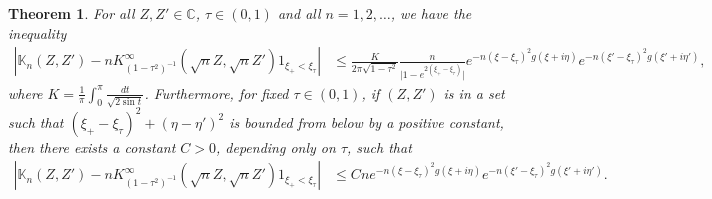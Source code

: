 \documentclass[%
 jmp,
cp,  %
 amsmath,amsthm,amssymb,%
 reprint,%
onecolumn]{revtex4-2}
\newtheorem{theorem}{Theorem}[section]
\begin{document}
\begin{theorem} \label{thm:errorTermUniform}
For all $Z, Z'\in\mathbb C$, $\tau\in (0,1)$ and all $n=1,2,\ldots$, we have the inequality
\begin{align} \label{eq:errorTermUniform1}
\left|\mathbb K_n(Z,Z') - n K_{(1-\tau^2)^{-1}}^{\infty}\left(\sqrt n Z, \sqrt n Z'\right) \mathfrak{1}_{\xi_+<\xi_\tau}\right|
&\leq  \frac{K}{2\pi \sqrt{1-\tau^2}}
\frac{n}{\lvert 1-e^{2(\xi_+-\xi_\tau)}\rvert} 
e^{- n (\xi-\xi_\tau)^2 g(\xi+i\eta)} e^{- n (\xi'-\xi_\tau)^2 g(\xi'+i\eta')},
\end{align} 
where $K= \displaystyle\frac{1}{\pi} \int_0^\pi \frac{dt}{\sqrt{2 \sin t}}$.
Furthermore, for fixed $\tau\in(0,1)$, if $(Z,Z')$ is in a set such that $(\xi_+ - \xi_\tau)^2+(\eta-\eta')^2$ is bounded from below by a positive constant, then there exists a constant $C>0$, depending only on $\tau$, such that
\begin{align} \label{eq:errorTermUniform2}
\left|\mathbb K_n(Z,Z') - n K_{(1-\tau^2)^{-1}}^{\infty}\left(\sqrt n Z, \sqrt n Z'\right) \mathfrak{1}_{\xi_+<\xi_\tau}\right|
&\leq C n e^{- n (\xi-\xi_\tau)^2 g(\xi+i\eta)} e^{- n (\xi'-\xi_\tau)^2 g(\xi'+i\eta')}.\\ \nonumber
\end{align} 
\end{theorem}

\end{document}

